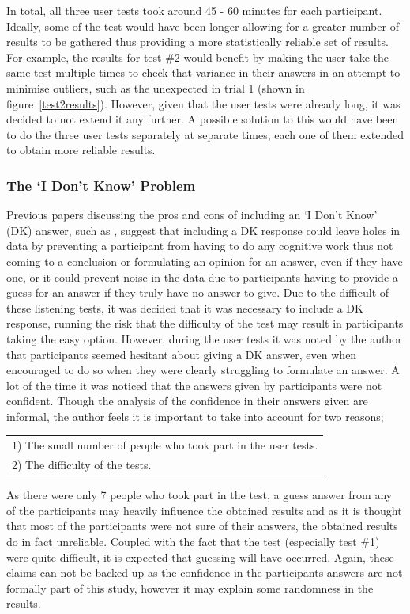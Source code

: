 \documentclass[../../main.tex]{subfiles}
\begin{document}
				In total, all three user tests took around 45 - 60 minutes for each participant. Ideally, some of the test would have been longer allowing for a greater number of results to be gathered thus providing a more statistically reliable set of results. For example, the results for test \#2 would benefit by making the user take the same test multiple times to check that variance in their answers in an attempt to minimise outliers, such as the unexpected in trial 1 (shown in figure~\ref{test2results}). However, given that the user tests were already long, it was decided to not extend it any further. A possible solution to this would have been to do the three user tests separately at separate times, each one of them extended to obtain more reliable results.


			\subsubsection{The `I Don't Know' Problem}
				Previous papers discussing the pros and cons of including an `I Don't Know' (DK) answer, such as \cite{DK}, suggest that including a DK response could leave holes in data by preventing a participant from having to do any cognitive work thus not coming to a conclusion or formulating an opinion for an answer, even if they have one, or it could prevent noise in the data due to participants having to provide a guess for an answer if they truly have no answer to give. Due to the difficult of these listening tests, it was decided that it was necessary to include a DK response, running the risk that the difficulty of the test may result in participants taking the easy option. However, during the user tests it was noted by the author that participants seemed hesitant about giving a DK answer, even when encouraged to do so when they were clearly struggling to formulate an answer. A lot of the time it was noticed that the answers given by participants were not confident. Though the analysis of the confidence in their answers given are informal, the author feels it is important to take into account for two reasons;
				\begin{tabular}{l}
				1) The small number of people who took part in the user tests.\\
				2) The difficulty of the tests.
				\end{tabular}

				As there were only 7 people who took part in the test, a guess answer from any of the participants may heavily influence the obtained results and as it is thought that most of the participants were not sure of their answers, the obtained results do in fact unreliable. Coupled with the fact that the test (especially test \#1) were quite difficult, it is expected that guessing will have occurred. Again, these claims can not be backed up as the confidence in the participants answers are not formally part of this study, however it may explain some randomness in the results.
\end{document}
